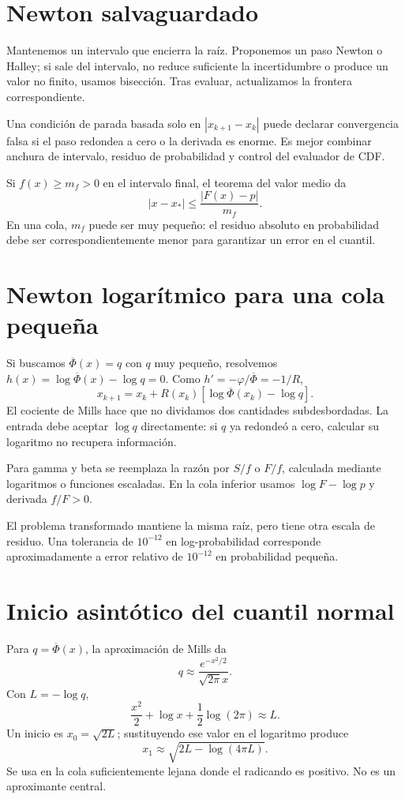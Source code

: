 \documentclass[11pt,a4paper]{article}
\theoremstyle{definition}
\newcommand{\ph}{\varphi}
\newcommand{\Q}{\overline\Phi}
\newcounter{problema}
\begin{document}
\section{Newton salvaguardado}
Mantenemos un intervalo que encierra la raíz. Proponemos un paso Newton o Halley; si sale del intervalo, no reduce suficiente la incertidumbre o produce un valor no finito, usamos bisección. Tras evaluar, actualizamos la frontera correspondiente.

Una condición de parada basada solo en $|x_{k+1}-x_k|$ puede declarar convergencia falsa si el paso redondea a cero o la derivada es enorme. Es mejor combinar anchura de intervalo, residuo de probabilidad y control del evaluador de CDF.

Si $f(x)\ge m_f>0$ en el intervalo final, el teorema del valor medio da
\[
|x-x_*|\le\frac{|F(x)-p|}{m_f}.
\]
En una cola, $m_f$ puede ser muy pequeño: el residuo absoluto en probabilidad debe ser correspondientemente menor para garantizar un error en el cuantil.

\section{Newton logarítmico para una cola pequeña}
Si buscamos $\Q(x)=q$ con $q$ muy pequeño, resolvemos
$h(x)=\log\Q(x)-\log q=0$. Como $h'=-\ph/\Q=-1/R$,
\[
x_{k+1}=x_k+
R(x_k)[\log\Q(x_k)-\log q].
\]
El cociente de Mills hace que no dividamos dos cantidades subdesbordadas. La entrada debe aceptar $\log q$ directamente: si $q$ ya redondeó a cero, calcular su logaritmo no recupera información.

Para gamma y beta se reemplaza la razón por $S/f$ o $F/f$, calculada mediante logaritmos o funciones escaladas. En la cola inferior usamos
$\log F-\log p$ y derivada $f/F>0$.

El problema transformado mantiene la misma raíz, pero tiene otra escala de residuo. Una tolerancia de $10^{-12}$ en log-probabilidad corresponde aproximadamente a error relativo de $10^{-12}$ en probabilidad pequeña.

\section{Inicio asintótico del cuantil normal}
Para $q=\Q(x)$, la aproximación de Mills da
\[
q\approx\frac{e^{-x^2/2}}{\sqrt{2\pi}x}.
\]
Con $L=-\log q$,
\[
\frac{x^2}2+\log x+\frac12\log(2\pi)\approx L.
\]
Un inicio es $x_0=\sqrt{2L}$; sustituyendo ese valor en el logaritmo produce
\[
x_1\approx\sqrt{2L-\log(4\pi L)}.
\]
Se usa en la cola suficientemente lejana donde el radicando es positivo. No es un aproximante central.
\end{document}
